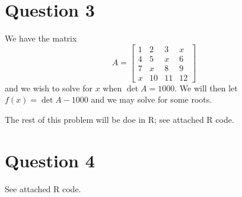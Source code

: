 \documentclass{article}
\begin{document}
	\section{Question 3}
	We have the matrix
	\[
	A = 
	\begin{bmatrix}
	1&2&3&x\\
	4&5&x&6\\
	7&x&8&9\\
	x&10&11&12
	\end{bmatrix}
	\]
	and we wish to solve for $x$ when $\det A = 1000$. We will then let $f(x) = \det A - 1000$ and we may solve for some roots.
	
	The rest of this problem will be doe in R; see attached R code.
	
	\section{Question 4}
	See attached R code.
\end{document}
